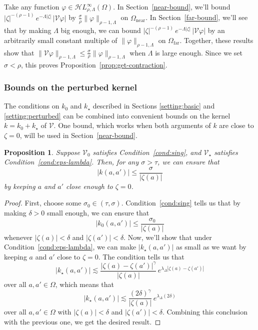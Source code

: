 \documentclass{article}
\theoremstyle{plain}
\newtheorem{prop}{Proposition}
\newcommand{\singexp}[2]{\mathcal{H}L^\infty_{#1, #2}}
\newcommand{\volterra}{\mathcal{V}}
\newcommand{\hardpart}{\mathcal{V}_0}
\newcommand{\softpart}{\mathcal{V}_\star}
\newcommand{\kerwhole}{k}
\newcommand{\hardker}{k_0}
\newcommand{\softker}{k_\star}
\newcommand{\domain}{\Omega}
\newcommand{\near}{\Omega_\text{near}}
\newcommand{\far}{\Omega_\text{far}}
\begin{document}
Take any function $\varphi \in \singexp{\rho}{\Lambda}(\domain)$. In Section~\ref{near-bound}, we'll bound $|\zeta|^{-(\rho-1)}\,e^{-\Lambda|\zeta|}\,|\volterra\varphi|$ by $\tfrac{\sigma}{\rho} \|\varphi\|_{\rho-1, \Lambda}$ on $\near$. In Section~\ref{far-bound}, we'll see that by making $\Lambda$ big enough, we can bound $|\zeta|^{-(\rho-1)}\,e^{-\Lambda|\zeta|}\,|\volterra\varphi|$ by an arbitrarily small constant multiple of $\|\varphi\|_{\rho-1, \Lambda}$ on $\far$. Together, these results show that $\|\volterra \varphi\|_{\rho-1, \Lambda} \le \tfrac{\sigma}{\rho} \|\varphi\|_{\rho-1, \Lambda}$ when $\Lambda$ is large enough. Since we set $\sigma < \rho$, this proves Proposition~\ref{prop:get-contraction}.
\subsubsection{Bounds on the perturbed kernel}\label{sec:bounds on k}
The conditions on $\hardker$ and $\softker$ described in Sections \ref{setting:basic} and \ref{setting:perturbed} can be combined into convenient bounds on the kernel $\kerwhole = \hardker + \softker$ of $\volterra$. One bound, which works when both arguments of $\kerwhole$ are close to $\zeta = 0$, will be used in Section~\ref{near-bound}.
\begin{prop}\label{prop:whole-ker-near-bound}
Suppose $\hardpart$ satisfies Condition~\eqref{cond:sing}, and $\softpart$ satisfies Condition~\eqref{cond:eps-lambda}. Then, for any $\sigma > \tau$, we can ensure that
\[ |\kerwhole(a, a')| \le \frac{\sigma}{|\zeta(a)|} \]
by keeping $a$ and $a'$ close enough to $\zeta = 0$.
\end{prop}
\begin{proof}
First, choose some $\sigma_0 \in (\tau, \sigma)$. Condition~\eqref{cond:sing} tells us that by making $\delta > 0$ small enough, we can ensure that
\[ |\hardker(a, a')| \le \frac{\sigma_0}{|\zeta(a)|} \]
whenever $|\zeta(a)| < \delta$ and $|\zeta(a')| < \delta$. Now, we'll show that under Condition~\eqref{cond:eps-lambda}, we can make $|\softker(a, a')|$ as small as we want by keeping $a$ and $a'$ close to $\zeta = 0$. The condition tells us that
\[ | \softker(a, a') | \lesssim\frac{|\zeta(a)-\zeta(a')|^\gamma}{|\zeta(a)|}\,e^{\lambda_\Delta|\zeta(a)-\zeta(a')|}\]
over all $a, a' \in \domain$, which means that
\[ | \softker(a, a') | \lesssim\frac{(2\delta)^\gamma}{|\zeta(a)|}\,e^{\lambda_\Delta(2\delta)}\]
over all $a, a' \in \domain$ with $|\zeta(a)| < \delta$ and $|\zeta(a')| < \delta$. Combining this conclusion with the previous one, we get the desired result.
\end{proof}
\end{document}
